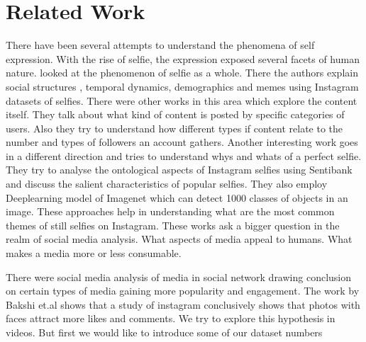 \section{ Related Work }
There have been several attempts to understand the phenomena of self expression. With the rise of selfie, the expression exposed several facets of human nature. \cite{Souza2015} looked at the phenomenon of selfie as a whole. There the authors explain social structures , temporal dynamics, demographics and memes using Instagram datasets of selfies. There were other works in this area \cite{hu2014we} which explore the content itself. They talk about what kind of content is posted by specific categories of users. Also they try to understand how different types if content relate to the number and types of followers an account gathers. Another interesting work \cite{goodSelfie} goes in a different direction and tries to understand whys and whats of a perfect selfie. They try to analyse the ontological aspects of Instagram selfies using Sentibank \cite{SentiBank} and discuss the salient characteristics of popular selfies. They also employ Deeplearning model of Imagenet \cite{NIPS2012_4824} which can detect 1000 classes of objects in an image. These approaches help in understanding what are the most common themes of still selfies on Instagram.  These works ask a bigger question in the realm of social media analysis. What aspects of media appeal to humans. What makes a media more or less consumable.
\par
There were social media analysis of media in social network drawing conclusion on certain types of media gaining more popularity and engagement. The work by Bakshi et.al \cite{Bakhshi:2014:FEU:2611105.2557403} shows that a study of instagram conclusively shows that photos with faces attract more likes and comments. We try to explore this hypothesis in videos. But first we would like to introduce some of our dataset numbers
